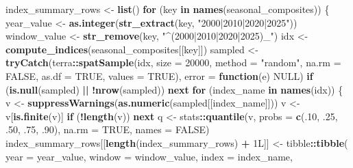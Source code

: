 \documentclass[
]{article}
\newenvironment{Shaded}{\begin{snugshade}}{\end{snugshade}}
\newcommand{\AttributeTok}[1]{\textcolor[rgb]{0.13,0.29,0.53}{#1}}
\newcommand{\ConstantTok}[1]{\textcolor[rgb]{0.56,0.35,0.01}{#1}}
\newcommand{\ControlFlowTok}[1]{\textcolor[rgb]{0.13,0.29,0.53}{\textbf{#1}}}
\newcommand{\DataTypeTok}[1]{\textcolor[rgb]{0.13,0.29,0.53}{#1}}
\newcommand{\DecValTok}[1]{\textcolor[rgb]{0.00,0.00,0.81}{#1}}
\newcommand{\FunctionTok}[1]{\textcolor[rgb]{0.13,0.29,0.53}{\textbf{#1}}}
\newcommand{\NormalTok}[1]{#1}
\newcommand{\OtherTok}[1]{\textcolor[rgb]{0.56,0.35,0.01}{#1}}
\newcommand{\SpecialCharTok}[1]{\textcolor[rgb]{0.81,0.36,0.00}{\textbf{#1}}}
\newcommand{\StringTok}[1]{\textcolor[rgb]{0.31,0.60,0.02}{#1}}
\begin{document}
\begin{Shaded}
\begin{Highlighting}[]
\NormalTok{index\_summary\_rows }\OtherTok{\textless{}{-}} \FunctionTok{list}\NormalTok{()}
\ControlFlowTok{for}\NormalTok{ (key }\ControlFlowTok{in} \FunctionTok{names}\NormalTok{(seasonal\_composites)) \{}
\NormalTok{  year\_value }\OtherTok{\textless{}{-}} \FunctionTok{as.integer}\NormalTok{(}\FunctionTok{str\_extract}\NormalTok{(key, }\StringTok{"2000|2010|2020|2025"}\NormalTok{))}
\NormalTok{  window\_value }\OtherTok{\textless{}{-}} \FunctionTok{str\_remove}\NormalTok{(key, }\StringTok{"\^{}(2000|2010|2020|2025)\_"}\NormalTok{)}
\NormalTok{  idx }\OtherTok{\textless{}{-}} \FunctionTok{compute\_indices}\NormalTok{(seasonal\_composites[[key]])}
\NormalTok{  sampled }\OtherTok{\textless{}{-}} \FunctionTok{tryCatch}\NormalTok{(terra}\SpecialCharTok{::}\FunctionTok{spatSample}\NormalTok{(idx, }\AttributeTok{size =} \DecValTok{20000}\NormalTok{, }\AttributeTok{method =} \StringTok{"random"}\NormalTok{, }\AttributeTok{na.rm =} \ConstantTok{FALSE}\NormalTok{,}
                                       \AttributeTok{as.df =} \ConstantTok{TRUE}\NormalTok{, }\AttributeTok{values =} \ConstantTok{TRUE}\NormalTok{), }\AttributeTok{error =} \ControlFlowTok{function}\NormalTok{(e) }\ConstantTok{NULL}\NormalTok{)}
  \ControlFlowTok{if}\NormalTok{ (}\FunctionTok{is.null}\NormalTok{(sampled) }\SpecialCharTok{||} \SpecialCharTok{!}\FunctionTok{nrow}\NormalTok{(sampled)) }\ControlFlowTok{next}
  \ControlFlowTok{for}\NormalTok{ (index\_name }\ControlFlowTok{in} \FunctionTok{names}\NormalTok{(idx)) \{}
\NormalTok{    v }\OtherTok{\textless{}{-}} \FunctionTok{suppressWarnings}\NormalTok{(}\FunctionTok{as.numeric}\NormalTok{(sampled[[index\_name]]))}
\NormalTok{    v }\OtherTok{\textless{}{-}}\NormalTok{ v[}\FunctionTok{is.finite}\NormalTok{(v)]}
    \ControlFlowTok{if}\NormalTok{ (}\SpecialCharTok{!}\FunctionTok{length}\NormalTok{(v)) }\ControlFlowTok{next}
\NormalTok{    q }\OtherTok{\textless{}{-}}\NormalTok{ stats}\SpecialCharTok{::}\FunctionTok{quantile}\NormalTok{(v, }\AttributeTok{probs =} \FunctionTok{c}\NormalTok{(.}\DecValTok{10}\NormalTok{, .}\DecValTok{25}\NormalTok{, .}\DecValTok{50}\NormalTok{, .}\DecValTok{75}\NormalTok{, .}\DecValTok{90}\NormalTok{), }\AttributeTok{na.rm =} \ConstantTok{TRUE}\NormalTok{, }\AttributeTok{names =} \ConstantTok{FALSE}\NormalTok{)}
\NormalTok{    index\_summary\_rows[[}\FunctionTok{length}\NormalTok{(index\_summary\_rows) }\SpecialCharTok{+} \DecValTok{1}\DataTypeTok{L}\NormalTok{]] }\OtherTok{\textless{}{-}}\NormalTok{ tibble}\SpecialCharTok{::}\FunctionTok{tibble}\NormalTok{(}
      \AttributeTok{year =}\NormalTok{ year\_value, }\AttributeTok{window =}\NormalTok{ window\_value, }\AttributeTok{index =}\NormalTok{ index\_name,}

\end{Highlighting}
\end{Shaded}
\end{document}
